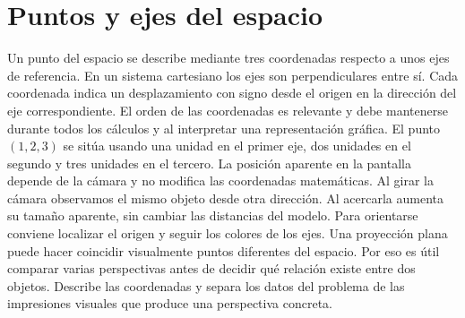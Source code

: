 \section{Puntos y ejes del espacio}
Un punto del espacio se describe mediante tres coordenadas respecto a unos ejes
de referencia. En un sistema cartesiano los ejes son perpendiculares entre sí.
Cada coordenada indica un desplazamiento con signo desde el origen en la dirección
del eje correspondiente. El orden de las coordenadas es relevante y debe mantenerse
durante todos los cálculos y al interpretar una representación gráfica.
El punto $(1,2,3)$ se sitúa usando una unidad en el primer eje,
dos unidades en el segundo y tres unidades en el tercero. La posición aparente
en la pantalla depende de la cámara y no modifica las coordenadas matemáticas.
Al girar la cámara observamos el mismo objeto desde otra dirección.
Al acercarla aumenta su tamaño aparente, sin cambiar las distancias del modelo.
Para orientarse conviene localizar el origen y seguir los colores de los ejes.
Una proyección plana puede hacer coincidir visualmente puntos diferentes del espacio.
Por eso es útil comparar varias perspectivas antes de decidir qué relación existe
entre dos objetos. Describe las coordenadas y separa los datos del problema de
las impresiones visuales que produce una perspectiva concreta.
